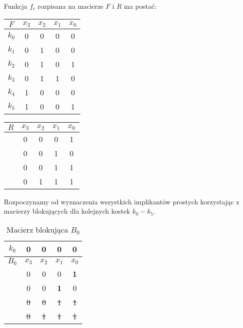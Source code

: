 \setcounter{implicant_counter}{0}

Funkcja $f_e$ rozpisana na macierze $F$ i $R$ ma postać:
\begin{center}
    \begin{tabular}[t]{ |c|c c c c|}
        \hline
        $F$ & $x_3$ & $x_2$ & $x_1$ & $x_0$ \\
        \hline
        $k_0$ & 0 & 0 & 0 & 0 \\
        $k_1$ & 0 & 1 & 0 & 0 \\
        $k_2$ & 0 & 1 & 0 & 1 \\
        $k_3$ & 0 & 1 & 1 & 0 \\
        $k_4$ & 1 & 0 & 0 & 0 \\
        $k_5$ & 1 & 0 & 0 & 1 \\
        \hline
    \end{tabular}
    \hspace{1cm}
    \begin{tabular}[t]{ |c|c c c c| }
        \hline
        $R$ & $x_3$ & $x_2$ & $x_1$ & $x_0$ \\
        \hline
        & 0 & 0 & 0 & 1 \\
        & 0 & 0 & 1 & 0 \\
        & 0 & 0 & 1 & 1 \\
        & 0 & 1 & 1 & 1 \\
        \hline
    \end{tabular}
\end{center}

Rozpoczynamy od wyznaczenia wszystkich implikantów prostych korzystając z macierzy blokujących dla kolejnych kostek
$k_0-k_5$.

\begin{table}[H]
    \centering
    \begin{tabular}[t]{ |c|c c c c| }
        \hline
        $k_0$ & 0 & 0 & 0 & 0 \\
        \hline\hline
        $B_0$ & $x_3$ & $x_2$ & $x_1$ & $x_0$ \\
        \hline
        & 0 & 0 & 0 & \textbf{1} \\
        & 0 & 0 & \textbf{1} & 0 \\
        & \sout{0} & \sout{0} & \sout{1} & \sout{1} \\
        & \sout{0} & \sout{1} & \sout{1} & \sout{1} \\
        \hline
    \end{tabular}
    \caption{Macierz blokująca $B_0$}\label{tab:b0f}
\end{table}


